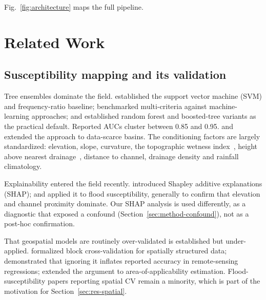 \documentclass[10pt,twocolumn]{article}
\begin{document}
Fig.~\ref{fig:architecture} maps the full pipeline.

\section{Related Work}
\label{sec:related}

\subsection{Susceptibility mapping and its validation}
Tree ensembles dominate the field. \citet{tehrany2014} established the support vector machine (SVM) and frequency-ratio baseline; \citet{khosravi2018} benchmarked multi-criteria
against machine-learning approaches; \citet{arabameri2019} and \citet{saha2021}
established random forest and boosted-tree variants as the practical default.
Reported AUCs cluster between 0.85 and 0.95. \citet{wang2020} and
\citet{avand2021} extended the approach to data-scarce basins.
The conditioning factors are largely standardized: elevation, slope, curvature,
the topographic wetness index~\citep{beven1979}, height above nearest
drainage~\citep{renno2008,nobre2011}, distance to channel, drainage density and
rainfall climatology.

Explainability entered the field recently. \citet{lundberg2017} introduced Shapley additive explanations (SHAP);
\citet{aydin2022} and \citet{seydi2023} applied it to flood susceptibility,
generally to confirm that elevation and channel proximity dominate. Our SHAP
analysis is used differently, as a diagnostic that exposed a confound
(Section~\ref{sec:method-confound}), not as a post-hoc confirmation.

That geospatial models are routinely over-validated is established but
under-applied. \citet{roberts2017} formalized block cross-validation for
spatially structured data; \citet{ploton2020} demonstrated that ignoring it
inflates reported accuracy in remote-sensing regressions; \citet{meyer2021}
extended the argument to area-of-applicability estimation. Flood-susceptibility
papers reporting spatial CV remain a minority, which is part of the motivation
for Section~\ref{sec:res-spatial}.
\end{document}
